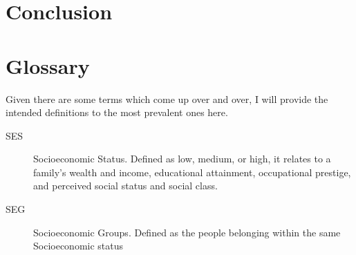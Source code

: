\documentclass[fleqn,10pt]{olplainarticle}
\begin{document}
\section*{Conclusion}
\section*{Glossary}
Given there are some terms which come up over and over, I will provide the intended definitions to the most prevalent ones here.

\begin{description}
\item[SES] Socioeconomic Status. Defined as low, medium, or high, it relates to a family's wealth and income, educational attainment, occupational prestige, and perceived social status and social class.\citep{sesdef}
\item[SEG] Socioeconomic Groups. Defined as the people belonging within the same Socioeconomic status
\end{description}



\end{document}
